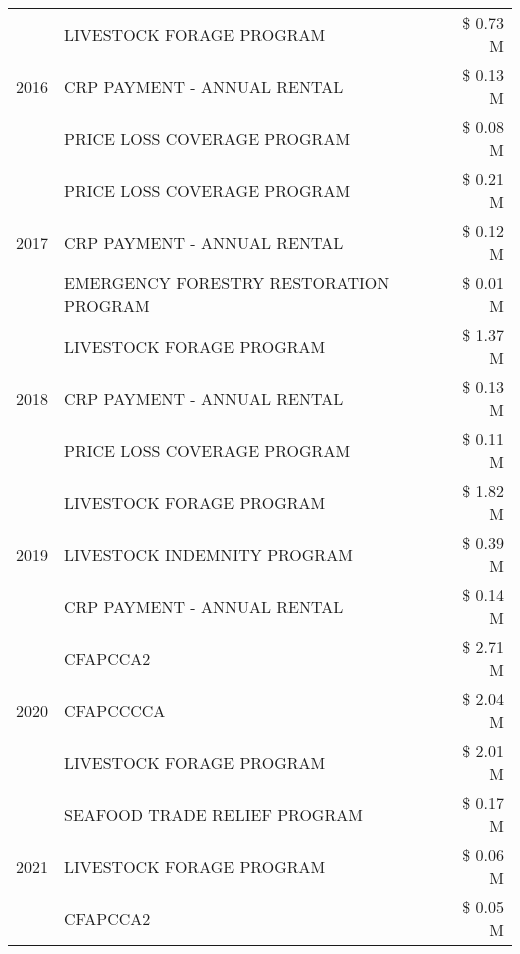 \begin{tabular}{llr}
\cline{1-3}
\multirow[t]{3}{*}{2016} & LIVESTOCK FORAGE PROGRAM & \$ 0.73 M \\
 & CRP PAYMENT - ANNUAL RENTAL & \$ 0.13 M \\
 & PRICE LOSS COVERAGE PROGRAM & \$ 0.08 M \\
\cline{1-3}
\multirow[t]{3}{*}{2017} & PRICE LOSS COVERAGE PROGRAM & \$ 0.21 M \\
 & CRP PAYMENT - ANNUAL RENTAL & \$ 0.12 M \\
 & EMERGENCY FORESTRY RESTORATION PROGRAM & \$ 0.01 M \\
\cline{1-3}
\multirow[t]{3}{*}{2018} & LIVESTOCK FORAGE PROGRAM & \$ 1.37 M \\
 & CRP PAYMENT - ANNUAL RENTAL & \$ 0.13 M \\
 & PRICE LOSS COVERAGE PROGRAM & \$ 0.11 M \\
\cline{1-3}
\multirow[t]{3}{*}{2019} & LIVESTOCK FORAGE PROGRAM & \$ 1.82 M \\
 & LIVESTOCK INDEMNITY PROGRAM & \$ 0.39 M \\
 & CRP PAYMENT - ANNUAL RENTAL & \$ 0.14 M \\
\cline{1-3}
\multirow[t]{3}{*}{2020} & CFAPCCA2 & \$ 2.71 M \\
 & CFAPCCCCA & \$ 2.04 M \\
 & LIVESTOCK FORAGE PROGRAM & \$ 2.01 M \\
\cline{1-3}
\multirow[t]{3}{*}{2021} & SEAFOOD TRADE RELIEF PROGRAM & \$ 0.17 M \\
 & LIVESTOCK FORAGE PROGRAM & \$ 0.06 M \\
 & CFAPCCA2 & \$ 0.05 M \\
\cline{1-3}
\bottomrule
\end{tabular}
